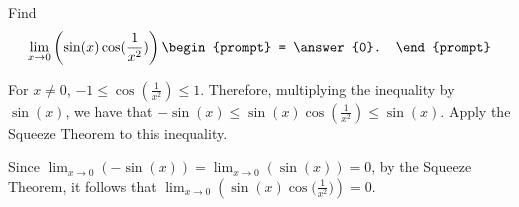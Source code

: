 \documentclass{ximera}
\author{Gregory Hartman \and Matthew Carr}
\begin{document}
\begin{exercise}





Find 
\[
\lim_{x\to0}\left({\sin(x)\cos({\frac{1}{x^2}}})\right)
\begin{prompt}
= \answer{0}.
\end{prompt}
\]

\begin{hint}
For $x\ne0$, $-1\le\cos({\frac{1}{x^2}})\le1$. Therefore, multiplying the inequality by $\sin(x)$, we have that $-\sin(x)\le\sin(x)\cos({\frac{1}{x^2}})\le\sin(x)$. Apply the Squeeze Theorem to this inequality.
\end{hint}
\begin{hint}
Since $\lim_{x\to0}\left({-\sin(x)}\right)=\lim_{x\to0}\left({\sin(x)}\right)=0$, by the Squeeze Theorem, it follows that $\lim_{x\to0}\left({\sin(x)\cos({\frac{1}{x^2}}})\right)=0$.
\end{hint}

\end{exercise}
\end{document}
